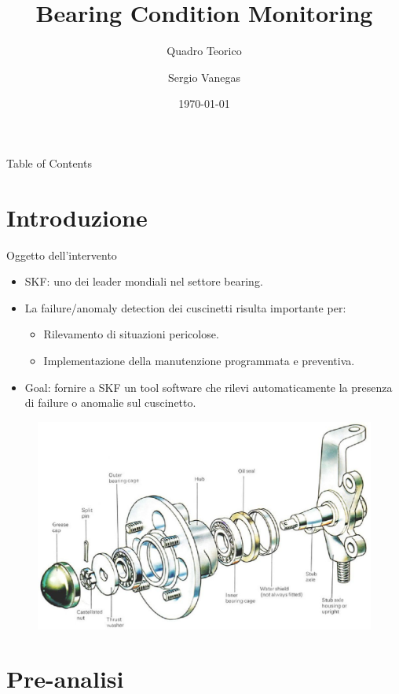 \documentclass{beamer}
\title{Bearing Condition Monitoring}
\subtitle{Quadro Teorico}
\author{Sergio Vanegas}
\institute{Modelway S.r.l.}
\date{\today}
\begin{document}
\frame{\titlepage}

\begin{frame}{Table of Contents}
    \tableofcontents
\end{frame}

\section{Introduzione}

\begin{frame}{Oggetto dell'intervento}
    \begin{itemize}
        \item SKF: uno dei leader mondiali nel settore bearing.
        \item La failure/anomaly detection dei cuscinetti risulta importante per:
        \begin{itemize}
            \item Rilevamento di situazioni pericolose.
            \item Implementazione della manutenzione programmata e preventiva.
        \end{itemize}
        \item Goal: fornire a SKF un tool software che rilevi automaticamente la presenza di failure o anomalie sul cuscinetto.
    \end{itemize}

    \begin{figure}
        \centering
        \includegraphics[height=0.3\textheight]{Figures/diagram.jpg}
    \end{figure}
\end{frame}

\section{Pre-analisi}
\end{document}
